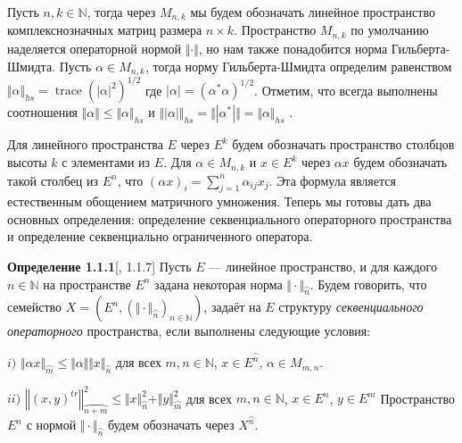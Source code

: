 \documentclass[12pt]{article}
\begin{document}
\medskip

Пусть $n, k\in\mathbb{N}$, тогда через $M_{n,k}$ мы будем обозначать линейное пространство комплекснозначных матриц размера $n\times k$. Пространство $M_{n,k}$ по умолчанию наделяется операторной нормой $\Vert\cdot\Vert$, но нам также понадобится норма Гильберта-Шмидта. Пусть $\alpha\in M_{n,k}$, тогда норму Гильберта-Шмидта определим равенством $\Vert\alpha\Vert_{hs}=\operatorname{trace}(|\alpha|^2)^{1/2}$
где $|\alpha|=(\alpha^*\alpha)^{1/2}$. Отметим, что всегда выполнены соотношения $\Vert\alpha\Vert\leq\Vert\alpha\Vert_{hs}$ и $\Vert|\alpha|\Vert_{hs}=\Vert|\alpha^*|\Vert=\Vert\alpha\Vert_{hs}$ .

\medskip

Для линейного пространства $E$ через $E^k$ будем обозначать пространство столбцов высоты $k$ с элементами из $E$. Для $\alpha\in M_{n,k}$ и $x\in E^k$ через $\alpha x$ будем обозначать такой столбец из $E^n$, что
$(\alpha x)_i=\sum_{j=1}^n \alpha_{ij} x_j$. Эта  формула является естественным обощением  матричного умножения. Теперь мы готовы дать два основных определения: определение секвенциального операторного пространства и определение секвенциально ограниченного оператора.

\medskip

{\bf Определение 1.1.1}[\cite{LamOpFolgen}, 1.1.7]\label{DefSQSpace} Пусть $E$ --- линейное пространство, и для каждого $n\in\mathbb{N}$ на пространстве $E^n$ задана некоторая норма $\Vert \cdot \Vert_{\wideparen{n}}$. 
Будем говорить, что семейство $X = (E^n, (\Vert \cdot \Vert_{\wideparen{n}})_{n \in \mathbb{N}})$, задаёт на $E$ структуру \textit{секвенциального операторного} пространства, если выполнены следующие условия:

$i)$ $\Vert \alpha x \Vert_{\wideparen{m}} \leq \Vert \alpha \Vert  \Vert x \Vert_{\wideparen{n}}$ для всех $m, n \in \mathbb{N}$, $x \in E^{\wideparen{n}}$, $\alpha \in M_{m, n}$.

$ii)$ $\left\Vert ( x, y)^{tr} \right\Vert^2_{\wideparen{n + m}} \leq   \Vert x \Vert_{\wideparen{n}}^2 + \Vert y \Vert_{\wideparen{m}}^2$ для всех $m, n \in \mathbb{N}$, $x \in E^n$, $y \in E^m$ 
\newline
Пространство $E^n$ с нормой $\Vert \cdot \Vert_{\wideparen{n}}$ будем обозначать через $X^{\wideparen{n}}$.

\medskip
\end{document}
